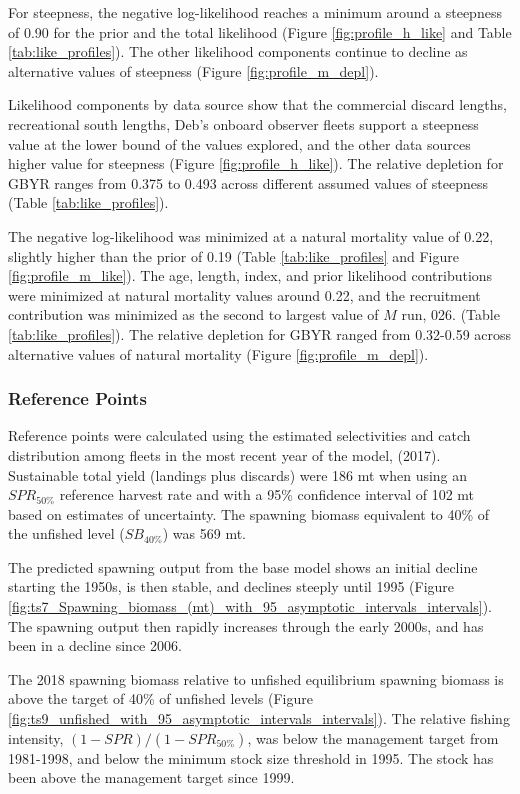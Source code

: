 \documentclass[12pt,]{article}
\begin{document}
For steepness, the negative log-likelihood reaches a minimum around a
steepness of 0.90 for the prior and the total likelihood (Figure
\ref{fig:profile_h_like} and Table \ref{tab:like_profiles}). The other
likelihood components continue to decline as alternative values of
steepness (Figure \ref{fig:profile_m_depl}).

Likelihood components by data source show that the commercial discard
lengths, recreational south lengths, Deb's onboard observer fleets
support a steepness value at the lower bound of the values explored, and
the other data sources higher value for steepness (Figure
\ref{fig:profile_h_like}). The relative depletion for GBYR ranges from
0.375 to 0.493 across different assumed values of steepness (Table
\ref{tab:like_profiles}).

The negative log-likelihood was minimized at a natural mortality value
of 0.22, slightly higher than the prior of 0.19 (Table
\ref{tab:like_profiles} and Figure \ref{fig:profile_m_like}). The age,
length, index, and prior likelihood contributions were minimized at
natural mortality values around 0.22, and the recruitment contribution
was minimized as the second to largest value of \(M\) run, 026. (Table
\ref{tab:like_profiles}). The relative depletion for GBYR ranged from
0.32-0.59 across alternative values of natural mortality (Figure
\ref{fig:profile_m_depl}).

\subsubsection{Reference Points}\label{reference-points-1}

Reference points were calculated using the estimated selectivities and
catch distribution among fleets in the most recent year of the model,
(2017). Sustainable total yield (landings plus discards) were 186 mt
when using an \(SPR_{50\%}\) reference harvest rate and with a 95\%
confidence interval of 102 mt based on estimates of uncertainty. The
spawning biomass equivalent to 40\% of the unfished level
(\(SB_{40\%}\)) was 569 mt.

The predicted spawning output from the base model shows an initial
decline starting the 1950s, is then stable, and declines steeply until
1995 (Figure
\ref{fig:ts7_Spawning_biomass_(mt)_with_95_asymptotic_intervals_intervals}).
The spawning output then rapidly increases through the early 2000s, and
has been in a decline since 2006.

The 2018 spawning biomass relative to unfished equilibrium spawning
biomass is above the target of 40\% of unfished levels (Figure
\ref{fig:ts9_unfished_with_95_asymptotic_intervals_intervals}). The
relative fishing intensity, \((1-SPR)/(1-SPR_{50\%})\), was below the
management target from 1981-1998, and below the minimum stock size
threshold in 1995. The stock has been above the management target since
1999.
\end{document}
